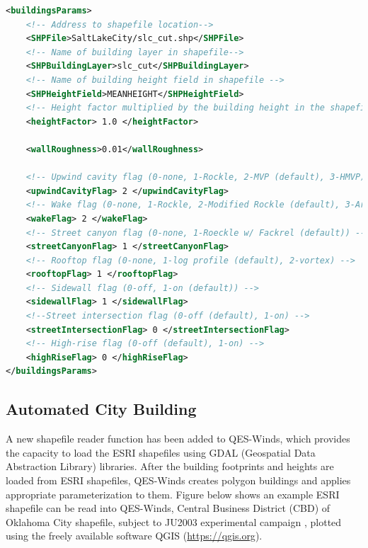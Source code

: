 \begin{lstlisting}[language=XML]
<buildingsParams>
    <!-- Address to shapefile location-->
    <SHPFile>SaltLakeCity/slc_cut.shp</SHPFile>
    <!-- Name of building layer in shapefile-->
    <SHPBuildingLayer>slc_cut</SHPBuildingLayer>
    <!-- Name of building height field in shapefile -->
    <SHPHeightField>MEANHEIGHT</SHPHeightField>
    <!-- Height factor multiplied by the building height in the shapefile (default = 1.0)-->
    <heightFactor> 1.0 </heightFactor>

    <wallRoughness>0.01</wallRoughness>

    <!-- Upwind cavity flag (0-none, 1-Rockle, 2-MVP (default), 3-HMVP) -->
    <upwindCavityFlag> 2 </upwindCavityFlag>
    <!-- Wake flag (0-none, 1-Rockle, 2-Modified Rockle (default), 3-Area Scaled) -->
    <wakeFlag> 2 </wakeFlag>
    <!-- Street canyon flag (0-none, 1-Roeckle w/ Fackrel (default)) -->
    <streetCanyonFlag> 1 </streetCanyonFlag>
    <!-- Rooftop flag (0-none, 1-log profile (default), 2-vortex) -->
    <rooftopFlag> 1 </rooftopFlag>
    <!-- Sidewall flag (0-off, 1-on (default)) -->
    <sidewallFlag> 1 </sidewallFlag>
    <!--Street intersection flag (0-off (default), 1-on) -->
    <streetIntersectionFlag> 0 </streetIntersectionFlag>
	<!-- High-rise flag (0-off (default), 1-on) -->
    <highRiseFlag> 0 </highRiseFlag>
</buildingsParams>
\end{lstlisting}

\subsection{Automated City Building}

A new shapefile reader function has been added to QES-Winds, which provides the capacity to load the ESRI shapefiles using GDAL (Geospatial Data Abstraction Library) libraries. After the building footprints and heights are loaded from ESRI shapefiles, QES-Winds creates polygon buildings and applies appropriate parameterization to them. Figure below shows an example ESRI shapefile can be read into QES-Winds, Central Business District (CBD) of Oklahoma City shapefile, subject to JU2003 experimental campaign \cite{allwine2006joint}, plotted using the freely available software QGIS (\href{https://qgis.org}{https://qgis.org}).

